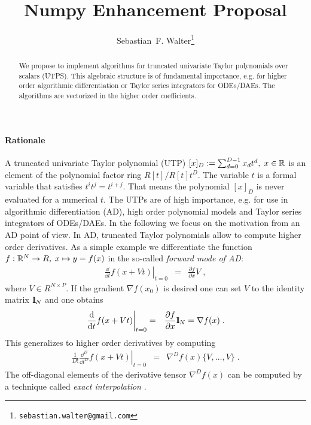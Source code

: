 \documentclass[a4paper,12pt,twoside]{article}
\title{Numpy Enhancement Proposal}
\author{Sebastian~F. Walter\footnote{\texttt{sebastian.walter@gmail.com}}}
\begin{document}
\maketitle

\begin{abstract}
We propose to implement algorithms for truncated univariate Taylor polynomials over scalars (UTPS). This algebraic structure is of fundamental importance, e.g. for higher order algorithmic differentiation or Taylor series integrators for ODEs/DAEs. The algorithms are vectorized in the higher order coefficients.
\end{abstract}
\paragraph{Rationale}
A truncated univariate Taylor polynomial (UTP) $[x]_D := \sum_{d=0}^{D-1} x_d t^d,\; x \in {\mathbb R}$ is an element of the polynomial factor ring $R[t]/R[t] t^D$. The variable $t$ is a formal variable that satisfies $t^i t^j = t^{i+j}$. That means the polynomial $[x]_D$ is never evaluated for a numerical $t$. The UTPs are of high importance, e.g. for use in algorithmic differentiation (AD), high order polynomial models and Taylor series integrators of ODEs/DAEs. In the following we focus on the motivation from an AD point of view.
In AD, truncated Taylor polynomials allow to compute higher order derivatives. As a simple example we differentiate the function $f: {\mathbb R}^N \rightarrow R, \; x \mapsto y = f(x)$ in the so-called \emph{forward mode of AD}:
\begin{eqnarray}
\left. \frac{\dd}{\dd t} f( x + V t) \right|_{t=0} &=& \frac{\partial f}{\partial x} V \;,
\end{eqnarray}
where $V \in R^{N \times P}$. If the gradient $\nabla f(x_0)$ is desired one can set $V$ to the identity matrix $1 \!\!\! \mathrm I_N$ and one obtains 
\begin{eqnarray}
 \left. \frac{{\rm d}}{{\rm d} t} f( x + V t) \right|_{t=0} &=& \frac{\partial f}{\partial x} 1 \!\!\! \mathrm I_N = \nabla f(x)\;.
\end{eqnarray}
This generalizes to higher order derivatives by computing 
\begin{eqnarray}
\left. \frac{1}{D!}\frac{\dd^D}{\dd t^D} f(x + Vt) \right|_{t=0} &=& \nabla^D f(x) \{ V,\dots, V \} \;.
\end{eqnarray}
The off-diagonal elements of the derivative tensor $\nabla^D f(x)$ can be computed by a technique called \emph{exact interpolation} \cite{Griewank2008EDP}.
\end{document}
